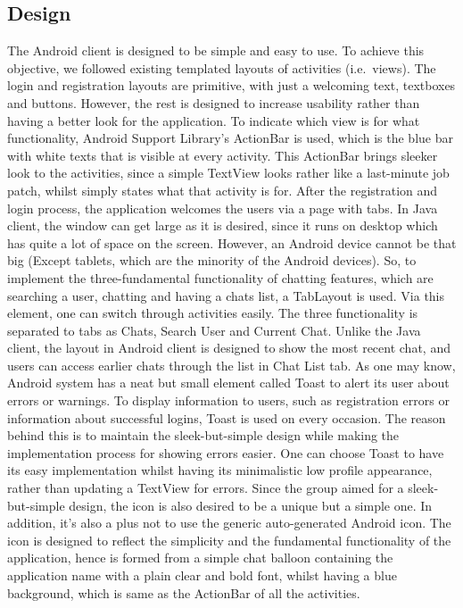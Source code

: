 \documentclass[11pt,a4paper]{report}
\begin{document}
\subsection{Design}
The Android client is designed to be simple and easy to use. To achieve this objective, we followed existing templated layouts of activities (i.e.\ views).
The login and registration layouts are primitive, with just a welcoming text, textboxes and buttons. However, the rest is designed to increase usability rather than having a better look for the application.
To indicate which view is for what functionality, Android Support Library’s ActionBar is used, which is the blue bar with white texts that is visible at every activity. This ActionBar brings sleeker look to the activities, since a simple TextView looks rather like a last-minute job patch, whilst simply states what that activity is for.
After the registration and login process, the application welcomes the users via a page with tabs. In Java client, the window can get large as it is desired, since it runs on desktop which has quite a lot of space on the screen. However, an Android device cannot be that big (Except tablets, which are the minority of the Android devices). So, to implement the three-fundamental functionality of chatting features, which are searching a user, chatting and having a chats list, a TabLayout is used. Via this element, one can switch through activities easily. The three functionality is separated to tabs as Chats, Search User and Current Chat. Unlike the Java client, the layout in Android client is designed to show the most recent chat, and users can access earlier chats through the list in Chat List tab.
As one may know, Android system has a neat but small element called Toast to alert its user about errors or warnings. To display information to users, such as registration errors or information about successful logins, Toast is used on every occasion. The reason behind this is to maintain the sleek-but-simple design while making the implementation process for showing errors easier. One can choose Toast to have its easy implementation whilst having its minimalistic low profile appearance, rather than updating a TextView for errors.
Since the group aimed for a sleek-but-simple design, the icon is also desired to be a unique but a simple one. In addition, it’s also a plus not to use the generic auto-generated Android icon. The icon is designed to reflect the simplicity and the fundamental functionality of the application, hence is formed from a simple chat balloon containing the application name with a plain clear and bold font, whilst having a blue background, which is same as the ActionBar of all the activities.
\end{document}

